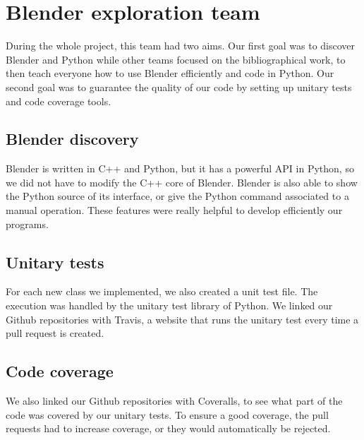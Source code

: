 \section{Blender exploration team}

During the whole project, this team had two aims. Our first goal was
to discover Blender and Python while other teams focused on the
bibliographical work, to then teach everyone how to use Blender
efficiently and code in Python. Our second goal was to guarantee the
quality of our code by setting up unitary tests and code coverage
tools.

\subsection{Blender discovery}

Blender is written in C++ and Python, but it has a powerful API in
Python, so we did not have to modify the C++ core of Blender. Blender
is also able to show the Python source of its interface, or give the
Python command associated to a manual operation. These features were
really helpful to develop efficiently our programs.


\subsection{Unitary tests}

For each new class we implemented, we also created a unit test
file. The execution was handled by the unitary test library of
Python. We linked our Github repositories with Travis, a website
that runs the unitary test every time a pull request is created.

\subsection{Code coverage}

We also linked our Github repositories with Coveralls, to see what
part of the code was covered by our unitary tests. To ensure a good
coverage, the pull requests had to increase coverage, or they would
automatically be rejected.
